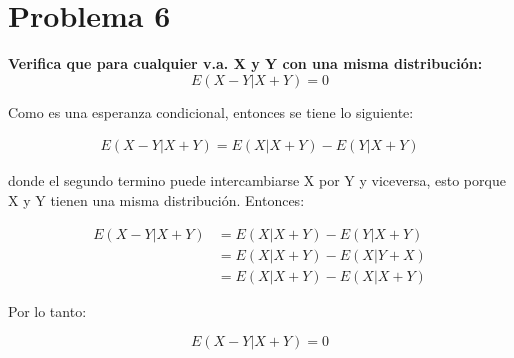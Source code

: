 \section*{Problema 6}
\textbf{Verifica que para cualquier v.a. X y Y con una misma distribución:}
\begin{equation*}
	E(X-Y|X+Y) = 0
\end{equation*}

Como es una esperanza condicional, entonces se tiene lo siguiente:

\begin{align*}
	E(X-Y|X+Y) = E(X|X+Y) - E(Y|X+Y)
\end{align*}

donde el segundo termino puede intercambiarse X por Y y viceversa, esto porque X y Y tienen una misma distribución. Entonces:

\begin{align*}
	E(X-Y|X+Y) & = E(X|X+Y) - E(Y|X+Y) \\
	           & =E(X|X+Y)-E(X|Y+X)    \\
	           & =E(X|X+Y)-E(X|X+Y)
\end{align*}

Por lo tanto:

\begin{equation*}
	E(X-Y|X+Y)=0
\end{equation*}
